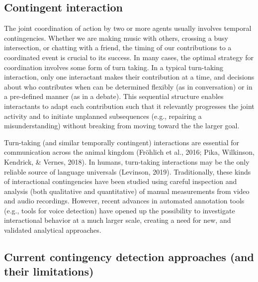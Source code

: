 \documentclass[10pt, letterpaper]{article}
\begin{document}
\hypertarget{contingent-interaction}{%
\subsection{Contingent interaction}\label{contingent-interaction}}

The joint coordination of action by two or more agents usually involves
temporal contingencies. Whether we are making music with others,
crossing a busy intersection, or chatting with a friend, the timing of
our contributions to a coordinated event is crucial to its success. In
many cases, the optimal strategy for coordination involves some form of
turn taking. In a typical turn-taking interaction, only one interactant
makes their contribution at a time, and decisions about who contributes
when can be determined flexibly (as in conversation) or in a pre-defined
manner (as in a debate). This sequential structure enables interactants
to adapt each contribution such that it relevantly progresses the joint
activity and to initiate unplanned subsequences (e.g., repairing a
misunderstanding) without breaking from moving toward the the larger
goal.

Turn-taking (and similar temporally contingent) interactions are
essential for communication across the animal kingdom (Fröhlich et al.,
2016; Pika, Wilkinson, Kendrick, \& Vernes, 2018). In humans,
turn-taking interactions may be the only reliable source of language
universals (Levinson, 2019). Traditionally, these kinds of interactional
contingencies have been studied using careful inspection and analysis
(both qualitative and quantitative) of manual measurements from video
and audio recordings. However, recent advances in automated annotation
tools (e.g., tools for voice detection) have opened up the possibility
to investigate interactional behavior at a much larger scale, creating a
need for new, and validated analytical approaches.

\hypertarget{current-contingency-detection-approaches-and-their-limitations}{%
\subsection{Current contingency detection approaches (and their
limitations)}\label{current-contingency-detection-approaches-and-their-limitations}}
\end{document}
